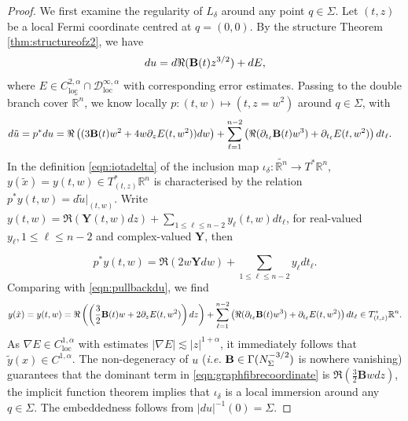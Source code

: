 \documentclass[11pt,a4paper]{article}
\numberwithin{equation}{section}%
\theoremstyle{definition}
\newcommand{\ie}{\emph{i.e.} }
\newcommand{\R}{\mathbb{R}}
\begin{document}
\begin{proof}
    We first examine the regularity of $L_\delta$ around any point $q\in \Sigma$. Let $(t,z)$ be a local Fermi coordinate centred at $q=(0,0)$. By the structure Theorem \ref{thm:structureofz2}, we have 
    $$du=d\Re({\bf{B}}(t)z^{3/2})+dE,$$
where $E\in C^{2,\alpha}_{\operatorname{loc}}\cap \mathcal{D}^{\infty,\alpha}_{\operatorname{loc}}$ with corresponding error estimates. Passing to the double branch cover $\widetilde{\R^n}$, we know locally $p:(t,w)\mapsto (t,z=w^2)$  around $q\in \Sigma$, with
\begin{equation}
    \begin{aligned}
    \label{eqn:pullbackdu}
        &  d\tilde u=p^*du=\Re\left((3{\bf B}(t)w^2+4w\partial_zE(t,w^2))dw\right)+\sum_{\ell=1}^{n-2}\left(\Re(\partial_{t_{\ell}}{\bf{B}}(t)w^3)+\partial_{t_\ell}E(t,w^2)\right)d{t_\ell}.
    \end{aligned}
\end{equation}
In the definition \eqref{eqn:iotadelta} of the inclusion map $\iota_{\delta}:\widetilde{\R^n}\to T^*\R^n$, $y(\tilde x)=y(t,w)\in T_{(t,z)}^*\R^n$ is characterised by the relation $p^* y(t,w)=d\tilde u|_{(t,w)}$. Write $y(t,w)=\Re(\textbf{Y}(t,w)dz)+\sum\limits_{1\leqslant \ell\leqslant n-2}y_\ell(t,w) dt_\ell$, for real-valued  $y_\ell,1\leqslant\ell\leqslant n-2$ and complex-valued $\textbf{Y}$, then

$$p^*y(t,w)=\Re(2w\textbf{Y}dw)+\sum_{1\leqslant\ell\leqslant n-2}y_\ell dt_\ell.$$
Comparing with \eqref{eqn:pullbackdu}, we find
\begin{equation}
    \label{eqn:graphfibrecoordinate}
    y(\tilde x)=y(t,w)=\Re\left(\left(\frac{3}{2}{\bf B}(t)w+2\partial_zE(t,w^2)\right)dz\right)+\sum_{\ell=1}^{n-2}\left(\Re(\partial_{t_{\ell}}{\bf{B}}(t)w^3)+\partial_{t_\ell}E(t,w^2)\right)d{t_\ell}\in T_{(t,z)}^*\R^n.
\end{equation}
As $\nabla E\in C^{1,\alpha}_{\operatorname{loc}}$ with
estimates $|\nabla E|\lesssim |z|^{1+\alpha}$, it immediately follows that $\tilde y(x)\in C^{1,\alpha}$. The non-degeneracy of $u$ (\ie ${\bf{B}}\in \Gamma(N_\Sigma^{-3/2})$ is nowhere vanishing) guarantees that the dominant term in \eqref{eqn:graphfibrecoordinate} is $\Re(\frac{3}{2}\textbf{B}wdz)$, the implicit function theorem implies that $\iota_\delta$ is a local immersion around any $q\in \Sigma$. The embeddedness follows from $|du|^{-1}(0)=\Sigma$. 


\end{proof}
\end{document}
